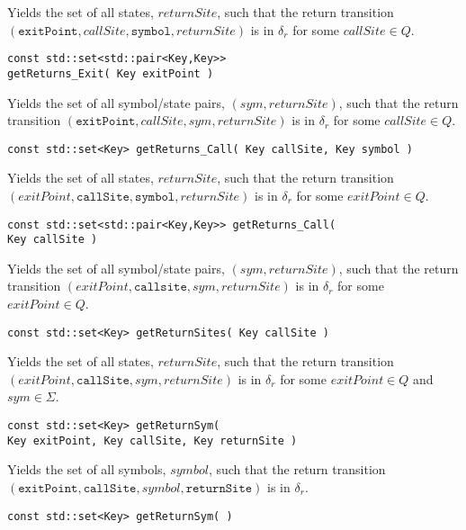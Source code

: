 \begin{description}
    Yields the set of all states, $returnSite$, such that the return
    transition $(\texttt{exitPoint},callSite,\texttt{symbol},returnSite)$ is
    in $\delta_r$ for some $callSite \in Q$.

  \item\texttt{const std::set<std::pair<Key,Key>> \\getReturns\_Exit( Key exitPoint )} \nopagebreak

    Yields the set of all symbol/state pairs, $(sym,returnSite)$, such that
    the return transition $(\texttt{exitPoint},callSite,sym,returnSite)$ is
    in $\delta_r$ for some $callSite \in Q$.

  \item\texttt{const std::set<Key> getReturns\_Call( Key callSite, Key symbol )} \nopagebreak

    Yields the set of all states, $returnSite$, such that the return
    transition $(exitPoint,\texttt{callSite},\texttt{symbol},returnSite)$ is
    in $\delta_r$ for some $exitPoint \in Q$.

  \item\texttt{const std::set<std::pair<Key,Key>> getReturns\_Call( \\ \hspace*{3.25cm} Key callSite )} \nopagebreak

    Yields the set of all symbol/state pairs, $(sym,returnSite)$, such that
    the return transition $(exitPoint,\texttt{callsite},sym,returnSite)$ is
    in $\delta_r$ for some $exitPoint \in Q$.

  \item\texttt{const std::set<Key> getReturnSites( Key callSite )} \nopagebreak

    Yields the set of all states, $returnSite$, such that the return
    transition $(exitPoint,\texttt{callSite},sym,returnSite)$ is in
    $\delta_r$ for some $exitPoint \in Q$ and $sym \in \Sigma$.

  \item\texttt{const std::set<Key> getReturnSym( \\ \hspace*{3.25cm}Key exitPoint, Key callSite, Key returnSite )} \nopagebreak

    Yields the set of all symbols, $symbol$, such that the return transition
    $(\texttt{exitPoint},\texttt{callSite},symbol,\texttt{returnSite})$ is in
    $\delta_r$.

  \item\texttt{const std::set<Key> getReturnSym( )} \nopagebreak


\end{description}
